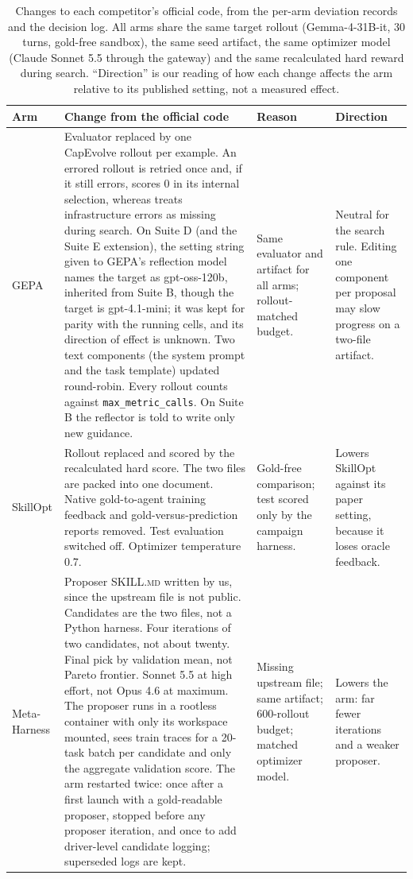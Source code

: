 \begin{table}[t]
\centering\scriptsize
\caption{Changes to each competitor's official code, from the per-arm deviation records and the decision log. All arms share the same target rollout (Gemma-4-31B-it, 30 turns, gold-free sandbox), the same seed artifact, the same optimizer model (Claude Sonnet 5.5 through the gateway) and the same recalculated hard reward during search. ``Direction'' is our reading of how each change affects the arm relative to its published setting, not a measured effect.}
\label{tab:deviations}
\begin{tabularx}{\textwidth}{@{}l>{\raggedright\arraybackslash}X>{\raggedright\arraybackslash}X>{\raggedright\arraybackslash}X@{}}
\toprule
Arm & Change from the official code & Reason & Direction \\
\midrule
GEPA & Evaluator replaced by one CapEvolve rollout per example. An errored rollout is retried once and, if it still errors, scores 0 in its internal selection, whereas \capevolve{} treats infrastructure errors as missing during search. On Suite D (and the Suite E extension), the setting string given to GEPA's reflection model names the target as gpt-oss-120b, inherited from Suite B, though the target is gpt-4.1-mini; it was kept for parity with the running cells, and its direction of effect is unknown. Two text components (the system prompt and the task template) updated round-robin. Every rollout counts against \texttt{max\_metric\_calls}. On Suite B the reflector is told to write only new guidance. & Same evaluator and artifact for all arms; rollout-matched budget. & Neutral for the search rule. Editing one component per proposal may slow progress on a two-file artifact. \\
SkillOpt & Rollout replaced and scored by the recalculated hard score. The two files are packed into one document. Native gold-to-agent training feedback and gold-versus-prediction reports removed. Test evaluation switched off. Optimizer temperature 0.7. & Gold-free comparison; test scored only by the campaign harness. & Lowers SkillOpt against its paper setting, because it loses oracle feedback. \\
Meta-Harness & Proposer \textsc{SKILL.md} written by us, since the upstream file is not public. Candidates are the two files, not a Python harness. Four iterations of two candidates, not about twenty. Final pick by validation mean, not Pareto frontier. Sonnet 5.5 at high effort, not Opus 4.6 at maximum. The proposer runs in a rootless container with only its workspace mounted, sees train traces for a 20-task batch per candidate and only the aggregate validation score. The arm restarted twice: once after a first launch with a gold-readable proposer, stopped before any proposer iteration, and once to add driver-level candidate logging; superseded logs are kept. & Missing upstream file; same artifact; 600-rollout budget; matched optimizer model. & Lowers the arm: far fewer iterations and a weaker proposer. \\

\end{tabularx}
\end{table}
